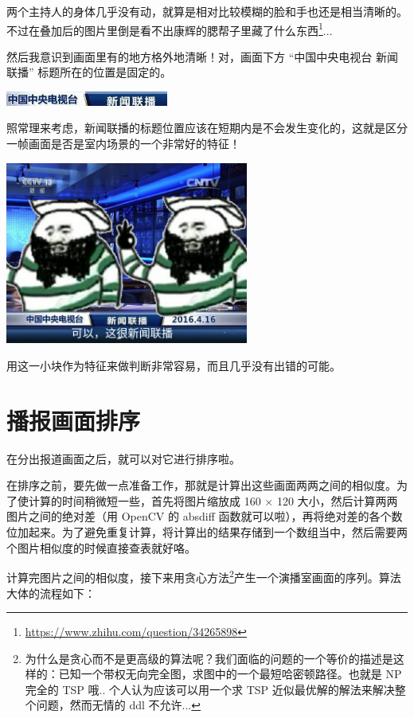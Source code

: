 \documentclass[a4paper, fontset=none]{article}
\begin{document}
两个主持人的身体几乎没有动，就算是相对比较模糊的脸和手也还是相当清晰的。不过在叠加后的图片里倒是看不出康辉的腮帮子里藏了什么东西\footnote{\url{https://www.zhihu.com/question/34265898}}...

然后我意识到画面里有的地方格外地清晰！对，画面下方 ``中国中央电视台 新闻联播'' 标题所在的位置是固定的。

\begin{center}
  \includegraphics[width=0.4\textwidth]{./title.jpg}
\end{center}

照常理来考虑，新闻联播的标题位置应该在短期内是不会发生变化的，这就是区分一帧画面是否是室内场景的一个非常好的特征！

\begin{center}
  \includegraphics[width=0.6\textwidth]{./hehe.jpg}
\end{center}

用这一小块作为特征来做判断非常容易，而且几乎没有出错的可能。


\section{播报画面排序}
\label{sec:播报画面排序}

在分出报道画面之后，就可以对它进行排序啦。

在排序之前，要先做一点准备工作，那就是计算出这些画面两两之间的相似度。为了使计算的时间稍微短一些，首先将图片缩放成 160 $\times$ 120 大小，然后计算两两图片之间的绝对差（用 OpenCV 的 absdiff 函数就可以啦），再将绝对差的各个数位加起来。为了避免重复计算，将计算出的结果存储到一个数组当中，然后需要两个图片相似度的时候直接查表就好咯。

计算完图片之间的相似度，接下来用贪心方法\footnote{为什么是贪心而不是更高级的算法呢？我们面临的问题的一个等价的描述是这样的：已知一个带权无向完全图，求图中的一个最短哈密顿路径。也就是 NP 完全的 TSP 哦.. 个人认为应该可以用一个求 TSP 近似最优解的解法来解决整个问题，然而无情的 ddl 不允许...}产生一个演播室画面的序列。算法大体的流程如下：
\end{document}
